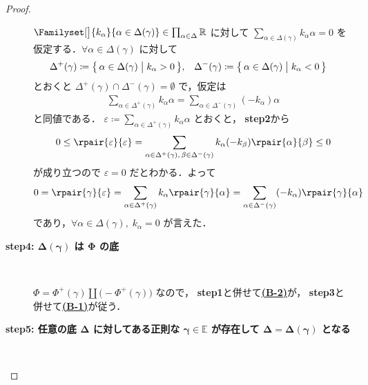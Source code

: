 \documentclass[rep_main]{subfiles}
\begin{document}
\begin{proof}
\begin{description}
		$\Familyset[\big]{k_\alpha}{\alpha \in \Delta (\gamma)} \in \prod_{\alpha \in \Delta} \mathbb{R}$ に対して $\sum_{\alpha \in \Delta (\gamma)} k_\alpha \alpha = 0$ を仮定する．$\forall \alpha \in \Delta(\gamma)$ に対して
		\begin{align}
			\Delta^+(\gamma) &\coloneqq \bigl\{\, \alpha \in \Delta(\gamma) \bigm| k_\alpha > 0 \,\bigr\}, &
			\Delta^-(\gamma) &\coloneqq \bigl\{\, \alpha \in \Delta(\gamma) \bigm| k_\alpha < 0 \,\bigr\}
		\end{align}
		とおくと $\Delta^+(\gamma) \cap \Delta^-(\gamma) = \emptyset$ で，仮定は
		\begin{align}
			\sum_{\alpha \in \Delta^+(\gamma)} k_\alpha \alpha = \sum_{\alpha \in \Delta^-(\gamma)} (-k_\alpha) \alpha
		\end{align}
		と同値である．
		$\varepsilon \coloneqq \sum_{\alpha \in \Delta^+ (\gamma)} k_\alpha \alpha$ とおくと，
		\textsf{\textbf{step2}}から
		\begin{align}
			0 \le \rpair{\varepsilon}{\varepsilon} = \sum_{\alpha \in \Delta^+(\gamma),\, \beta \in \Delta^-(\gamma)} k_\alpha (-k_\beta) \rpair{\alpha}{\beta} \le 0
		\end{align}
		が成り立つので $\varepsilon = 0$ だとわかる．よって
		\begin{align}
			0 &= \rpair{\gamma}{\varepsilon}
			= \sum_{\alpha \in \Delta^+(\gamma)} k_\alpha \rpair{\gamma}{\alpha}
			= \sum_{\alpha \in \Delta^-(\gamma)} (-k_\alpha) \rpair{\gamma}{\alpha}
		\end{align}
		であり，$\forall \alpha \in \Delta(\gamma),\; k_\alpha = 0$ が言えた．
		\item[\textbf{step4: $\bm{\Delta(\gamma)}$ は $\bm{\Phi}$ の底}]　
		
		$\Phi = \Phi^+ (\gamma) \amalg \bigl( -\Phi^+ (\gamma) \bigr)$ なので，
		\textsf{\textbf{step1}}と併せて\hyperref[def:base-root]{\textsf{\textbf{(B-2)}}}が，
		\textsf{\textbf{step3}}と併せて\hyperref[def:base-root]{\textsf{\textbf{(B-1)}}}が従う．

		\item[\textbf{step5: 任意の底 $\bm{\Delta}$ に対してある正則な $\bm{\gamma \in \mathbb{E}}$ が存在して $\bm{\Delta = \Delta(\gamma)}$ となる}]　
		

\end{description}
\end{proof}
\end{document}
